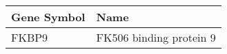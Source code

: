 \begin{tabular}{ll}
\toprule
Gene Symbol &                    Name \\
\midrule
      FKBP9 & FK506 binding protein 9 \\
\bottomrule
\end{tabular}

